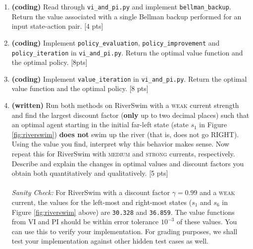 \begin{enumerate}[label=(\alph*)]
\item \textbf{(coding)} Read through \texttt{vi\_and\_pi.py} and implement \texttt{bellman\_backup}. Return the value associated with a single Bellman backup performed for an input state-action pair. [4 pts]\\


\item \textbf{(coding)} Implement \texttt{policy\_evaluation}, \texttt{policy\_improvement} and \texttt{policy\_iteration} in  \texttt{vi\_and\_pi.py}. Return the optimal value function and the optimal policy. [8pts]\\


\item \textbf{(coding)} Implement \texttt{value\_iteration} in \texttt{vi\_and\_pi.py}. Return the optimal value function and the optimal policy. [8 pts]\\


\item \textbf{(written)} Run both methods on RiverSwim with a \textsc{weak} current strength and find the largest discount factor (\textbf{only} up to two decimal places) such that an optimal agent starting in the initial far-left state (state $s_1$ in Figure \ref{fig:riverswim}) \textbf{does not} swim up the river (that is, does not go \textsc{RIGHT}). Using the value you find, interpret why this behavior makes sense. Now repeat this for RiverSwim with \textsc{medium} and \textsc{strong} currents, respectively. Describe and explain the changes in optimal values and discount factors you obtain both quantitatively and qualitatively. [5 pts]\\ \\
\textit{Sanity Check:} For RiverSwim with a discount factor $\gamma = 0.99$ and a \textsc{weak} current, the values for the left-most and right-most states ($s_1$ and $s_6$ in Figure \ref{fig:riverswim} above) are \texttt{30.328} and \texttt{36.859}. The value functions from VI and PI should be within error tolerance $10^{-3}$ of these values. You can use this to verify your implementation. For grading purposes, we shall test your implementation against other hidden test cases as well.

\end{enumerate}